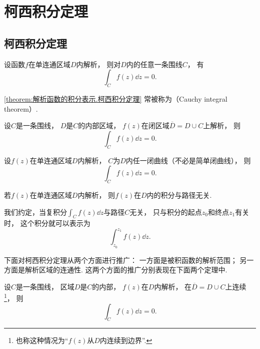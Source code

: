 \section{柯西积分定理}
\subsection{柯西积分定理}
\begin{theorem}\label{theorem:解析函数的积分表示.柯西积分定理}
设函数\(f\)在单连通区域\(D\)内解析，
则对\(D\)内的任意一条围线\(C\)，
有\begin{equation*}
	\int_C f(z) \dd{z} = 0.
\end{equation*}
\end{theorem}
\cref{theorem:解析函数的积分表示.柯西积分定理}
常被称为（Cauchy integral theorem）.

\begin{theorem}\label{theorem:解析函数的积分表示.柯西积分定理.闭区域的情形}
设\(C\)是一条围线，
\(D\)是\(C\)的内部区域，
\(f(z)\)在闭区域\(\overline{D}=D \cup C\)上解析，
则\begin{equation*}
	\int_C f(z) \dd{z} = 0.
\end{equation*}
\end{theorem}

\begin{corollary}\label{theorem:解析函数的积分表示.柯西积分定理.非简单闭曲线的情形}
设\(f(z)\)在单连通区域\(D\)内解析，
\(C\)为\(D\)内任一闭曲线（不必是简单闭曲线），
则\begin{equation*}
	\int_C f(z) \dd{z} = 0.
\end{equation*}
\end{corollary}

\begin{corollary}\label{theorem:解析函数的积分表示.解析函数在解析区域内的积分与路径无关}
若\(f(z)\)在单连通区域\(D\)内解析，
则\(f(z)\)在\(D\)内的积分与路径无关.
\end{corollary}

我们约定，当复积分\(\int_C f(z) \dd{z}\)与路径\(C\)无关，
只与积分的起点\(z_0\)和终点\(z_1\)有关时，
这个积分就可以表示为\begin{equation*}
	\int_{z_0}^{z_1} f(z) \dd{z}.
\end{equation*}

下面对柯西积分定理从两个方面进行推广：
一方面是被积函数的解析范围；
另一方面是解析区域的连通性.
这两个方面的推广分别表现在下面两个定理中.
\begin{theorem}
设\(C\)是一条围线，
区域\(D\)是\(C\)的内部，
\(f(z)\)在\(D\)内解析，
在\(\overline{D}=D \cup C\)上连续\footnote{也称这种情况为“\(f(z)\)从\(D\)内连续到边界”.}，
则\begin{equation*}
	\int_C f(z) \dd{z} = 0.
\end{equation*}
\end{theorem}

